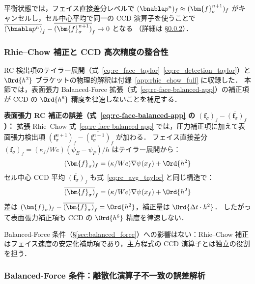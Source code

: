平衡状態では，フェイス直接差分レベルで $(\bnabla p^n)_f \approx (\bm{f}_\sigma^{n+1})_f$
がキャンセルし，セル中心平均で同一の CCD 演算子を使うことで
$\overline{(\bnabla p^n)}_f - \overline{(\bm{f}_\sigma^{n+1})}_f \to 0$ となる
（詳細は §\ref{app:balanced_force_taylor}）．


\subsubsection{Rhie--Chow 補正と CCD 高次精度の整合性}
\label{app:rc_precision}

RC 検出項のテイラー展開（式~\eqref{eq:rc_face_taylor}--\eqref{eq:rc_detection_taylor}）と
$\Ord{h^2}$ ブラケットの物理的解釈は付録~\ref{app:rhie_chow_full} に収録した．
本節では，表面張力 Balanced-Force 拡張（式~\eqref{eq:rc-face-balanced-app}）の補正項が
CCD の $\Ord{h^6}$ 精度を律速しないことを補足する．

\textbf{表面張力 RC 補正の誤差（式~\eqref{eq:rc-face-balanced-app} の $(\bm{f}_\sigma)_f - \overline{(\bm{f}_\sigma)}_f$）：}
拡張 Rhie--Chow 式~\eqref{eq:rc-face-balanced-app} では，圧力補正項に加えて表面張力検出項
$(\bm{f}_\sigma^{n+1})_f - \overline{(\bm{f}_\sigma^{n+1})}_f$ が加わる．
フェイス直接差分 $(\bm{f}_\sigma)_f = (\kappa_f/We)(\psi_E-\psi_P)/h$ はテイラー展開から：
\[
  (\bm{f}_\sigma)_f = (\kappa/We)\nabla\psi(x_f) + \Ord{h^2}
\]
セル中心 CCD 平均 $\overline{(\bm{f}_\sigma)}_f$ も式~\eqref{eq:rc_avg_taylor} と同じ構造で：
\[
  \overline{(\bm{f}_\sigma)}_f = (\kappa/We)\nabla\psi(x_f) + \Ord{h^2}
\]
差は $(\bm{f}_\sigma)_f - \overline{(\bm{f}_\sigma)}_f = \Ord{h^2}$，補正量は $\Ord{\Delta t \cdot h^2}$．
したがって表面張力補正項も CCD の $\Ord{h^6}$ 精度を律速しない．

Balanced-Force 条件（§\ref{sec:balanced_force}）への影響はない：Rhie--Chow 補正はフェイス速度の安定化補助項であり，主方程式の CCD 演算子とは独立の役割を担う．

\subsubsection{Balanced-Force 条件：離散化演算子不一致の誤差解析}
\label{app:balanced_force_taylor}

